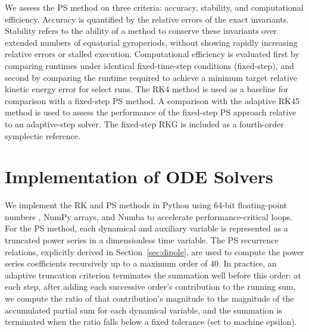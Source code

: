 \documentclass[draft]{agujournal2019}
\begin{document}


We assess the PS method on three criteria: accuracy, stability, and computational efficiency. Accuracy is quantified by the relative errors of the exact invariants. Stability refers to the ability of a method to conserve these invariants over extended numbers of equatorial gyroperiods, without showing rapidly increasing relative errors or stalled execution. Computational efficiency is evaluated first by comparing runtimes under identical fixed-time-step conditions (fixed-step), and second by comparing the runtime required to achieve a minimum target relative kinetic energy error for select runs. The RK4 method is used as a baseline for comparison with a fixed-step PS method. A comparison with the adaptive RK45 method is used to assess the performance of the fixed-step PS approach relative to an adaptive-step solver. The fixed-step RKG is included as a fourth-order symplectic reference.

\section{Implementation of ODE Solvers}
\label{sect:implementation}
We implement the RK and PS methods in Python using 64-bit floating-point numbers \cite{IEEE754}, NumPy \cite{harris2020} arrays, and Numba \cite{lam2015} to accelerate performance-critical loops. For the PS method, each dynamical and auxiliary variable is represented as a truncated power series in a dimensionless time variable. The PS recurrence relations, explicitly derived in Section~\ref{sec:dipole}, are used to compute the power series coefficients recursively up to a maximum order of 40. In practice, an adaptive truncation criterion terminates the summation well before this order: at each step, after adding each successive order's contribution to the running sum, we compute the ratio of that contribution's magnitude to the magnitude of the accumulated partial sum for each dynamical variable, and the summation is terminated when the ratio falls below a fixed tolerance (set to machine epsilon).
\end{document}

